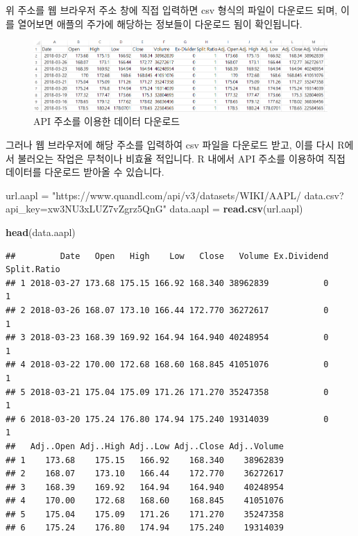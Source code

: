 \documentclass[]{book}
\newenvironment{Shaded}{\begin{snugshade}}{\end{snugshade}}
\newcommand{\KeywordTok}[1]{\textcolor[rgb]{0.13,0.29,0.53}{\textbf{#1}}}
\newcommand{\NormalTok}[1]{#1}
\newcommand{\StringTok}[1]{\textcolor[rgb]{0.31,0.60,0.02}{#1}}
\begin{document}
위 주소를 웹 브라우저 주소 창에 직접 입력하면 csv 형식의 파일이 다운로드 되며, 이를 열어보면 애플의 주가에 해당하는 정보들이 다운로드 됨이 확인됩니다.

\begin{figure}

{\centering \includegraphics[width=1\linewidth]{images/api_apple_csv} 

}

\caption{API 주소를 이용한 데이터 다운로드}\label{fig:unnamed-chunk-2}
\end{figure}

그러나 웹 브라우저에 해당 주소를 입력하여 csv 파일을 다운로드 받고, 이를 다시 R에서 불러오는 작업은 무척이나 비효율 적입니다. R 내에서 API 주소를 이용하여 직접 데이터를 다운로드 받아올 수 있습니다.

\begin{Shaded}
\begin{Highlighting}[]
\NormalTok{url.aapl =}\StringTok{ "https://www.quandl.com/api/v3/datasets/WIKI/AAPL/}
\StringTok{data.csv?api_key=xw3NU3xLUZ7vZgrz5QnG"}
\NormalTok{data.aapl =}\StringTok{ }\KeywordTok{read.csv}\NormalTok{(url.aapl)}

\KeywordTok{head}\NormalTok{(data.aapl)}
\end{Highlighting}
\end{Shaded}

\begin{verbatim}
##         Date   Open   High    Low   Close   Volume Ex.Dividend Split.Ratio
## 1 2018-03-27 173.68 175.15 166.92 168.340 38962839           0           1
## 2 2018-03-26 168.07 173.10 166.44 172.770 36272617           0           1
## 3 2018-03-23 168.39 169.92 164.94 164.940 40248954           0           1
## 4 2018-03-22 170.00 172.68 168.60 168.845 41051076           0           1
## 5 2018-03-21 175.04 175.09 171.26 171.270 35247358           0           1
## 6 2018-03-20 175.24 176.80 174.94 175.240 19314039           0           1
##   Adj..Open Adj..High Adj..Low Adj..Close Adj..Volume
## 1    173.68    175.15   166.92    168.340    38962839
## 2    168.07    173.10   166.44    172.770    36272617
## 3    168.39    169.92   164.94    164.940    40248954
## 4    170.00    172.68   168.60    168.845    41051076
## 5    175.04    175.09   171.26    171.270    35247358
## 6    175.24    176.80   174.94    175.240    19314039
\end{verbatim}
\end{document}
